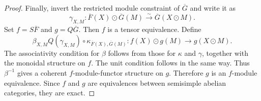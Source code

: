 \documentclass[10pt,a4paper]{amsart}
\begin{document}
\begin{proof}
Finally, invert the restricted module constraint of $\overline G$ and write it as
\begin{equation*}
\gamma_{X,M}:
\overline F(X)\odot\overline G(M)
\xrightarrow{\sim}
\overline G(X\odot M).
\end{equation*}
Set $f=S\overline F$ and $g=Q\overline G$. Then $f$ is a tensor equivalence. Define
\begin{equation*}
\beta_{X,M}
Q(\gamma_{X,M})\circ
\kappa_{\overline F(X),\overline G(M)}
:
f(X)\odot g(M)\rightarrow g(X\odot M).
\end{equation*}
The associativity condition for $\beta$ follows from those for $\kappa$ and $\gamma$, together with the monoidal structure on $f$. The unit condition follows in the same way. Thus $\beta^{-1}$ gives a coherent $f$-module-functor structure on $g$. Therefore $g$ is an $f$-module equivalence. Since $f$ and $g$ are equivalences between semisimple abelian categories, they are exact.
\end{proof}
\end{document}
